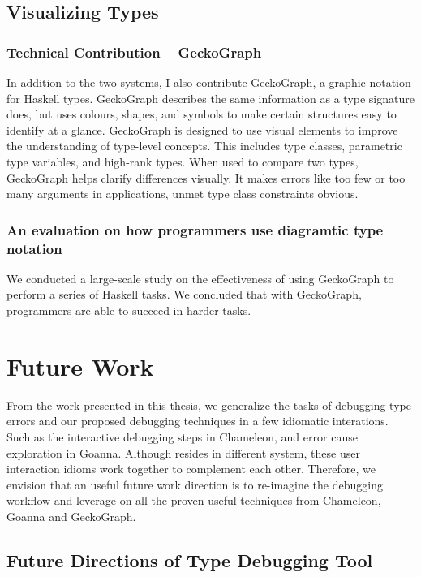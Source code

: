 \subsection{Visualizing Types}

\subsubsection{Technical Contribution -- GeckoGraph}

In addition to the two systems, I also contribute GeckoGraph, a graphic notation for Haskell types. GeckoGraph describes the same information as a type signature does, but uses colours, shapes, and symbols to make certain structures easy to identify at a glance. GeckoGraph is designed to use visual elements to improve the understanding of type-level concepts. This includes type classes, parametric type variables, and high-rank types. When used to compare two types, GeckoGraph helps clarify differences visually. It makes errors like too few or too many arguments in applications, unmet type class constraints obvious.

\subsubsection{An evaluation on how programmers use diagramtic type notation}

We conducted a large-scale study on the effectiveness of using GeckoGraph to perform a series of Haskell tasks. We concluded that with GeckoGraph, programmers are able to succeed in harder tasks.

\section{Future Work}

From the work presented in this thesis, we generalize the tasks of debugging type errors and our proposed debugging techniques in a few idiomatic interations.  Such as the interactive debugging steps in Chameleon, and error cause exploration in Goanna. Although resides in different system, these user interaction idioms work together to complement each other. Therefore, we envision that an useful future work direction is to re-imagine the debugging workflow and leverage on all the proven useful techniques from Chameleon, Goanna and GeckoGraph.

\subsection{Future Directions of Type Debugging Tool}

